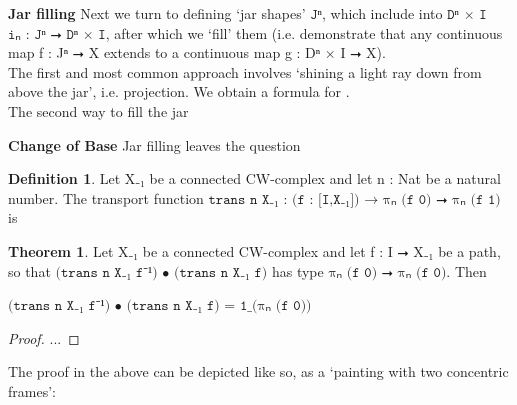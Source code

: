 \documentclass{book}
\theoremstyle{definition}
\newtheorem{definition}{Definition}
\newtheorem{theorem}{Theorem}
\begin{document}
{\bf Jar filling} Next we turn to defining `jar shapes' $\texttt{Jⁿ}$, which include into $\texttt{Dⁿ × I}$ $\texttt{iₙ : Jⁿ ⭢ Dⁿ × I}$, after which we `fill' them (i.e. demonstrate that any continuous map f : Jⁿ ⭢ X extends to a continuous map g : Dⁿ × I ⭢ X).\\

The first and most common approach involves `shining a light ray down from above the jar', i.e. projection. We obtain a formula for .\\

The second way to fill the jar

{\bf Change of Base} Jar filling leaves the question

\begin{definition}
Let X₋₁ be a connected CW-complex and let n : Nat be a natural number. The transport function $\texttt{trans\ n\ X₋₁ : (f : [I,X₋₁])  → πₙ (f 0) ⭢ πₙ (f 1)}$ is 
\end{definition}

\begin{theorem}
Let X₋₁ be a connected CW-complex and let f : I ⭢ X₋₁ be a path, so that $\texttt{(trans\ n X₋₁ f⁻¹) • (trans\ n X₋₁ f)}$ has type $\texttt{πₙ (f 0) ⭢ πₙ (f 0)}$. Then
\begin{center}
$\texttt{(trans\ n X₋₁ f⁻¹) • (trans\ n X₋₁ f) = 1\_(πₙ (f 0))}$
\end{center}
\end{theorem}

\begin{proof}
...
\end{proof}

The proof in the above can be depicted like so, as a `painting with two concentric frames':
\end{document}

